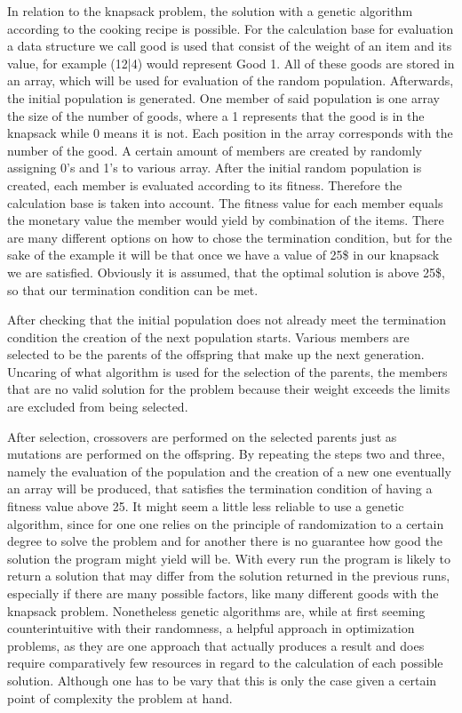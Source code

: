 \documentclass[11pt,a4paper]{article}
\begin{document}
In relation to the knapsack problem, the solution with a genetic algorithm according to the cooking recipe is possible.\cite{Ezziane:2002:SKP:965702.965705}
For the calculation base for evaluation a data structure we call good is used that consist of the weight of an item and its value, for example (12|4) would represent Good 1. All of these goods are stored in an array, which will be used for evaluation of the random population.
Afterwards, the initial population is generated. One member of said population is one array the size of the number of goods, where a 1 represents that the good is in the knapsack while 0 means it is not. Each position in the array corresponds with the number of the good. A certain amount of members are created by randomly assigning 0’s and 1’s to various array. After the initial random population is created, each member is evaluated according to its fitness. Therefore the calculation base is taken into account. The fitness value for each member equals the monetary value the member would yield by combination of the items.
There are many different options on how to chose the termination condition, but for the sake of the example it will be that once we have a value of 25\$ in our knapsack we are satisfied. Obviously it is assumed, that the optimal solution is above 25\$, so that our termination condition can be met.

After checking that the initial population does not already meet the termination condition the creation of the next population starts. Various members are selected to be the parents of the offspring that make up the next generation. Uncaring of what algorithm is used for the selection of the parents, the members that are no valid solution for the problem because their weight exceeds the limits are excluded from being selected.

After selection, crossovers are performed on the selected parents just as mutations are performed on the offspring.
By repeating the steps two and three, namely the evaluation of the population and the creation of a new one eventually an array will be produced, that satisfies the termination condition of having a fitness value above 25.
It might seem a little less reliable to use a genetic algorithm, since for one one relies on the principle of randomization to a certain degree to solve the problem and for another there is no guarantee how good the solution the program might yield will be. With every run the program is likely to return a solution that may differ from the solution returned in the previous runs, especially if there are many possible factors, like many different goods with the knapsack problem.
Nonetheless genetic algorithms are, while at first seeming counterintuitive with their randomness, a helpful approach in optimization problems, as they are one approach that actually produces a result and does require comparatively few resources in regard to the calculation of each possible solution. Although one has to be vary that this is only the case given a certain point of complexity the problem at hand.
\end{document}
